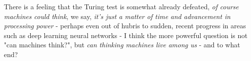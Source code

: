 \documentclass[]{article}
\begin{document}
There is a feeling that the Turing test is somewhat already defeated, \emph{of course machines could think}, we say, \emph{it's just a matter of time and advancement in processing power} - perhaps even out of hubris to sudden, recent progress in areas such as deep learning neural networks - I think the more powerful question is not "can machines think?", but \emph{can thinking machines live among us} - and to what end?



\end{document}
